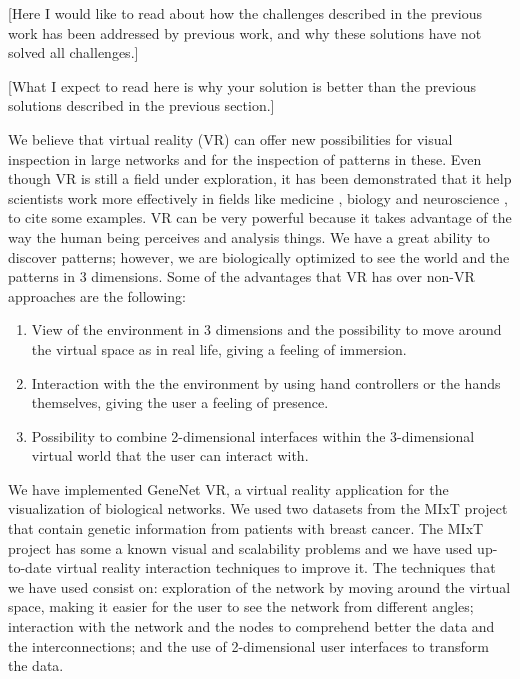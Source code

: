 
[Here I would like to read about how the challenges described in the previous work has been addressed by previous work, and why these solutions have not solved all challenges.]

[What I expect to read here is why your solution is better than the previous solutions described in the previous section.]

We believe that virtual reality (VR) can offer new possibilities for visual inspection in large networks and for the inspection of patterns in these. Even though VR is still a field under exploration, it has been demonstrated that it help scientists work more effectively in fields like medicine \cite{Laver11} \cite{xia_ip_samman_wong_gateno_wang_yeung_kot_tideman_2001} \cite{brain_damage_rehab}, biology \cite{bioinformatics_bti581} \cite{thorley_lawson_duca_shapiro_2008} and neuroscience \cite{bohil_alicea_biocca_2011}\cite{minderer_harvey_donato_moser_2016}, to  cite some examples. VR can be very powerful because it takes advantage of the way the human being perceives and analysis things. We have a great ability to discover patterns; however, we are biologically optimized to see the world and the patterns in 3 dimensions. Some of the advantages that VR has over non-VR approaches are the following:

\begin{enumerate}
  \item View of the environment in 3 dimensions and the possibility to move around the virtual space as in real life, giving a feeling of immersion.
  \item Interaction with the the environment by using hand controllers or the hands themselves, giving the user a feeling of presence.
  \item Possibility to combine 2-dimensional interfaces within the 3-dimensional virtual world that the user can interact with.
\end{enumerate}

We have implemented GeneNet VR, a virtual reality application for the visualization of biological networks. We used two datasets from the MIxT project \cite{dumeaux_fjukstad_interactions_tumor_blood} that contain genetic information from patients with breast cancer. The MIxT project has some a known visual and scalability problems and we have used up-to-date virtual reality interaction techniques to improve it. The techniques that we have used consist on: exploration of the network by moving around the virtual space, making it easier for the user to see the network from different angles; interaction with the network and the nodes to comprehend better the data and the interconnections; and the use of 2-dimensional user interfaces to transform the data.

